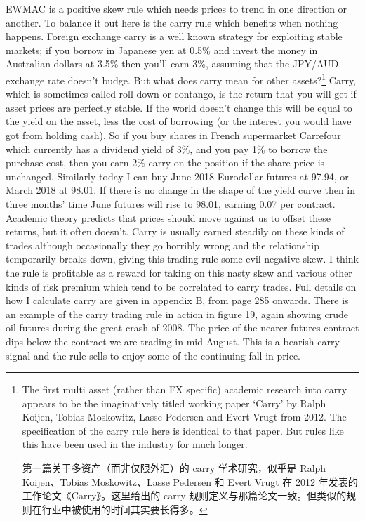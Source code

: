 \begin{englishblock} EWMAC is a positive skew rule which needs prices to trend in one direction or another. To balance it out here is the carry rule which benefits when nothing happens. Foreign exchange carry is a well known strategy for exploiting stable markets; if you borrow in Japanese yen at 0.5\% and invest the money in Australian dollars at 3.5\% then you'll earn 3\%, assuming that the JPY/AUD exchange rate doesn't budge. But what does carry mean for other assets?\footnote{The first multi asset (rather than FX specific) academic research into carry appears to be the imaginatively titled working paper ‘Carry' by Ralph Koijen, Tobias Moskowitz, Lasse Pedersen and Evert Vrugt from 2012. The specification of the carry rule here is identical to that paper. But rules like this have been used in the industry for much longer. \par 第一篇关于多资产（而非仅限外汇）的 carry 学术研究，似乎是 Ralph Koijen、Tobias Moskowitz、Lasse Pedersen 和 Evert Vrugt 在 2012 年发表的工作论文《Carry》。这里给出的 carry 规则定义与那篇论文一致。但类似的规则在行业中被使用的时间其实要长得多。} Carry, which is sometimes called roll down or contango, is the return that you will get if asset prices are perfectly stable. If the world doesn't change this will be equal to the yield on the asset, less the cost of borrowing (or the interest you would have got from holding cash). So if you buy shares in French supermarket Carrefour which currently has a dividend yield of 3\%, and you pay 1\% to borrow the purchase cost, then you earn 2\% carry on the position if the share price is unchanged. Similarly today I can buy June 2018 Eurodollar futures at 97.94, or March 2018 at 98.01. If there is no change in the shape of the yield curve then in three months' time June futures will rise to 98.01, earning 0.07 per contract. Academic theory predicts that prices should move against us to offset these returns, but it often doesn't. Carry is usually earned steadily on these kinds of trades although occasionally they go horribly wrong and the relationship temporarily breaks down, giving this trading rule some evil negative skew. I think the rule is profitable as a reward for taking on this nasty skew and various other kinds of risk premium which tend to be correlated to carry trades. Full details on how I calculate carry are given in appendix B, from page 285 onwards. There is an example of the carry trading rule in action in figure 19, again showing crude oil futures during the great crash of 2008. The price of the nearer futures contract dips below the contract we are trading in mid-August. This is a bearish carry signal and the rule sells to enjoy some of the continuing fall in price. \end{englishblock}

